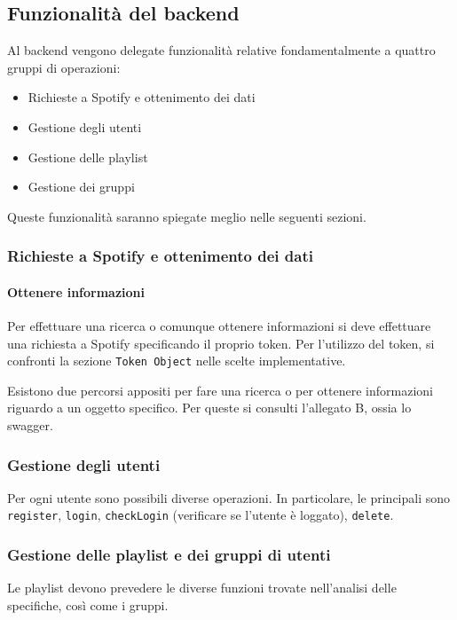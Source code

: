 \subsection{Funzionalità del backend}
Al backend vengono delegate funzionalità relative fondamentalmente a quattro gruppi di operazioni:\begin{itemize}
    \item Richieste a Spotify e ottenimento dei dati
    \item Gestione degli utenti
    \item Gestione delle playlist
    \item Gestione dei gruppi
\end{itemize}
Queste funzionalità saranno spiegate meglio nelle seguenti sezioni.
\subsubsection{Richieste a Spotify e ottenimento dei dati}
\paragraph{Ottenere informazioni}
Per effettuare una ricerca o comunque ottenere informazioni si deve effettuare una richiesta a Spotify specificando il proprio token. Per l'utilizzo del token, si confronti la sezione \verb|Token Object| nelle scelte implementative.

Esistono due percorsi appositi per fare una ricerca o per ottenere informazioni riguardo a un oggetto specifico. Per queste si consulti l'allegato B, ossia lo swagger.
\subsubsection{Gestione degli utenti}
Per ogni utente sono possibili diverse operazioni. In particolare, le principali sono \verb|register|, \verb|login|, \verb|checkLogin| (verificare se l'utente è loggato), \verb|delete|.
\subsubsection{Gestione delle playlist e dei gruppi di utenti}
Le playlist devono prevedere le diverse funzioni trovate nell'analisi delle specifiche, così come i gruppi.

\newpage